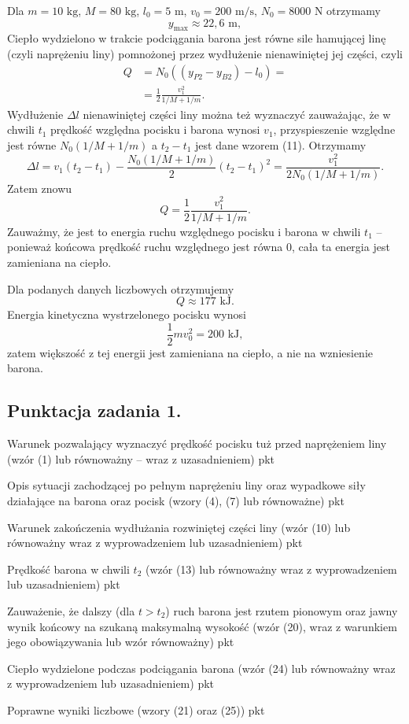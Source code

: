 \documentclass[12pt,a4paper]{article}
\newcommand{\punktacja}[2]{%
    #1 \dotfill #2\par
}
\begin{document}
Dla $m = 10 \text{ kg}$, $M = 80 \text{ kg}$, $l_0 = 5 \text{ m}$, $v_0 = 200 \text{ m/s}$, $N_0 = 8000 \text{ N}$ otrzymamy
\begin{equation}
    y_{\text{max}} \approx 22,6 \text{ m},
\end{equation}
Ciepło wydzielono w trakcie podciągania barona jest równe sile hamującej linę (czyli naprężeniu liny) pomnożonej przez wydłużenie nienawiniętej jej części, czyli
\begin{align}
    Q &= N_0((y_{P2} - y_{B2}) - l_0) = \\
    &= \frac{1}{2} \frac{v_1^2}{1/M + 1/m}.
\end{align}
Wydłużenie $\Delta l$ nienawiniętej części liny można też wyznaczyć zauważając, że w chwili $t_1$ prędkość względna pocisku i barona wynosi $v_1$, przyspieszenie względne jest równe $N_0(1/M + 1/m)$ a $t_2 - t_1$ jest dane wzorem (11). Otrzymamy
\[
\Delta l = v_1(t_2 - t_1) - \frac{N_0(1/M+1/m)}{2}(t_2-t_1)^2 = \frac{v_1^2}{2N_0(1/M+1/m)}.
\]
Zatem znowu
\begin{equation}
    Q = \frac{1}{2} \frac{v_1^2}{1/M + 1/m}.
\end{equation}
Zauważmy, że jest to energia ruchu względnego pocisku i barona w chwili $t_1$ – ponieważ końcowa prędkość ruchu względnego jest równa 0, cała ta energia jest zamieniana na ciepło.

Dla podanych danych liczbowych otrzymujemy
\begin{equation}
    Q \approx 177 \text{ kJ}.
\end{equation}
Energia kinetyczna wystrzelonego pocisku wynosi
\[
    \frac{1}{2} m v_0^2 = 200 \text{ kJ},
\]
zatem większość z tej energii jest zamieniana na ciepło, a nie na wzniesienie barona.

\vspace{1cm}

\subsection*{Punktacja zadania 1.}
\punktacja{Warunek pozwalający wyznaczyć prędkość pocisku tuż przed naprężeniem liny (wzór (1) lub równoważny -- wraz z uzasadnieniem)}{1 pkt}
\punktacja{Opis sytuacji zachodzącej po pełnym naprężeniu liny oraz wypadkowe siły działające na barona oraz pocisk (wzory (4), (7) lub równoważne)}{1 pkt}
\punktacja{Warunek zakończenia wydłużania rozwiniętej części liny (wzór (10) lub równoważny wraz z wyprowadzeniem lub uzasadnieniem)}{1 pkt}
\punktacja{Prędkość barona w chwili $t_2$ (wzór (13) lub równoważny wraz z wyprowadzeniem lub uzasadnieniem)}{2 pkt}
\punktacja{Zauważenie, że dalszy (dla $t > t_2$) ruch barona jest rzutem pionowym oraz jawny wynik końcowy na szukaną maksymalną wysokość (wzór (20), wraz z warunkiem jego obowiązywania lub wzór równoważny)}{2 pkt}
\punktacja{Ciepło wydzielone podczas podciągania barona (wzór (24) lub równoważny wraz z wyprowadzeniem lub uzasadnieniem)}{2 pkt}
\punktacja{Poprawne wyniki liczbowe (wzory (21) oraz (25))}{1 pkt}
\end{document}
